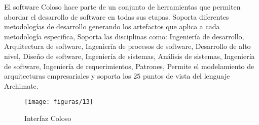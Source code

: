 El software Coloso hace parte de un conjunto de herramientas que permiten abordar el desarrollo de software en todas sus etapas. Soporta diferentes metodologías de desarrollo generando los artefactos que aplica a cada metodología especifica, Soporta las disciplinas como: Ingeniería de desarrollo, Arquitectura de software, Ingeniería de procesos de software, Desarrollo de alto nivel, Diseño de software, Ingeniería de sistemas, Análisis de sistemas, Ingeniería de software, Ingeniería de requerimientos, Patrones, Permite el modelamiento de arquitecturas empresariales y soporta los 25 puntos de vista del lenguaje Archimate. \cite{ref5,ref13}
  \begin{figure}[H]
   	\centering
   	\texttt{[image: figuras/13]}
   	\captionsetup{width=.95\textwidth}
   	\caption{Interfaz Coloso}
   	\label{figura13}
  \end{figure}